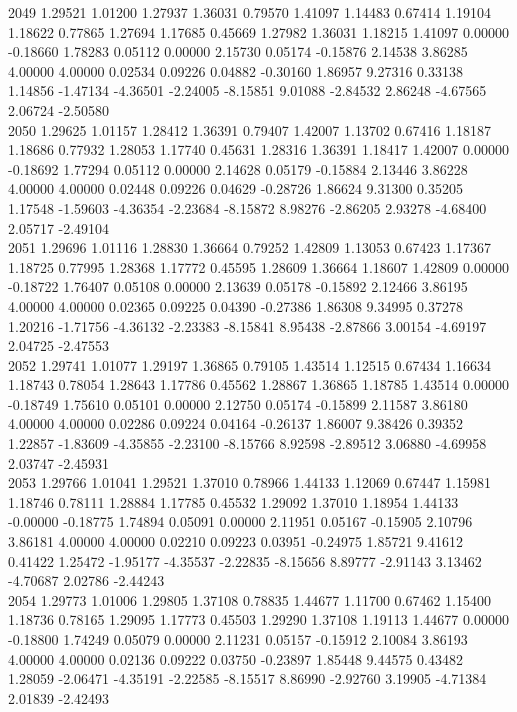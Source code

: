 {2049 1.29521 1.01200 1.27937 1.36031 0.79570 1.41097 1.14483 0.67414 1.19104 1.18622 0.77865 1.27694 1.17685 0.45669 1.27982 1.36031 1.18215 1.41097 0.00000 -0.18660 1.78283 0.05112 0.00000 2.15730 0.05174 -0.15876 2.14538 3.86285 4.00000 4.00000 0.02534 0.09226 0.04882 -0.30160 1.86957 9.27316 0.33138 1.14856 -1.47134 -4.36501 -2.24005 -8.15851 9.01088 -2.84532 2.86248 -4.67565 2.06724 -2.50580 \\
2050 1.29625 1.01157 1.28412 1.36391 0.79407 1.42007 1.13702 0.67416 1.18187 1.18686 0.77932 1.28053 1.17740 0.45631 1.28316 1.36391 1.18417 1.42007 0.00000 -0.18692 1.77294 0.05112 0.00000 2.14628 0.05179 -0.15884 2.13446 3.86228 4.00000 4.00000 0.02448 0.09226 0.04629 -0.28726 1.86624 9.31300 0.35205 1.17548 -1.59603 -4.36354 -2.23684 -8.15872 8.98276 -2.86205 2.93278 -4.68400 2.05717 -2.49104 \\
2051 1.29696 1.01116 1.28830 1.36664 0.79252 1.42809 1.13053 0.67423 1.17367 1.18725 0.77995 1.28368 1.17772 0.45595 1.28609 1.36664 1.18607 1.42809 0.00000 -0.18722 1.76407 0.05108 0.00000 2.13639 0.05178 -0.15892 2.12466 3.86195 4.00000 4.00000 0.02365 0.09225 0.04390 -0.27386 1.86308 9.34995 0.37278 1.20216 -1.71756 -4.36132 -2.23383 -8.15841 8.95438 -2.87866 3.00154 -4.69197 2.04725 -2.47553 \\
2052 1.29741 1.01077 1.29197 1.36865 0.79105 1.43514 1.12515 0.67434 1.16634 1.18743 0.78054 1.28643 1.17786 0.45562 1.28867 1.36865 1.18785 1.43514 0.00000 -0.18749 1.75610 0.05101 0.00000 2.12750 0.05174 -0.15899 2.11587 3.86180 4.00000 4.00000 0.02286 0.09224 0.04164 -0.26137 1.86007 9.38426 0.39352 1.22857 -1.83609 -4.35855 -2.23100 -8.15766 8.92598 -2.89512 3.06880 -4.69958 2.03747 -2.45931 \\
2053 1.29766 1.01041 1.29521 1.37010 0.78966 1.44133 1.12069 0.67447 1.15981 1.18746 0.78111 1.28884 1.17785 0.45532 1.29092 1.37010 1.18954 1.44133 -0.00000 -0.18775 1.74894 0.05091 0.00000 2.11951 0.05167 -0.15905 2.10796 3.86181 4.00000 4.00000 0.02210 0.09223 0.03951 -0.24975 1.85721 9.41612 0.41422 1.25472 -1.95177 -4.35537 -2.22835 -8.15656 8.89777 -2.91143 3.13462 -4.70687 2.02786 -2.44243 \\
2054 1.29773 1.01006 1.29805 1.37108 0.78835 1.44677 1.11700 0.67462 1.15400 1.18736 0.78165 1.29095 1.17773 0.45503 1.29290 1.37108 1.19113 1.44677 0.00000 -0.18800 1.74249 0.05079 0.00000 2.11231 0.05157 -0.15912 2.10084 3.86193 4.00000 4.00000 0.02136 0.09222 0.03750 -0.23897 1.85448 9.44575 0.43482 1.28059 -2.06471 -4.35191 -2.22585 -8.15517 8.86990 -2.92760 3.19905 -4.71384 2.01839 -2.42493 \\
}

